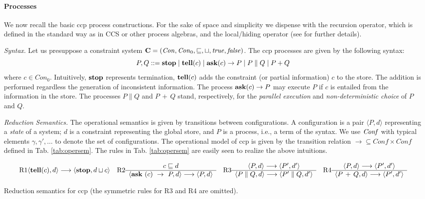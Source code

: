 \documentclass[copyright,creativecommons]{eptcs}
\newcommand{\tellp}[1]{\tell(#1)}
\newcommand{\askp}[2]{\ask \  #1 \  \rightarrow \ #2}
\newcommand{\true}{{\it true}}
\newcommand{\false}{{\it false}}
\newcommand{\ask}{{\bf ask}}
\newcommand{\tell}{{\bf tell}}
\newcommand{\Stop}{{\bf stop}}
\newcommand{\rrarrow}{\longrightarrow}
\newcommand{\Con}{\mathit{Con}}
\newcommand{\pairccp}[2]{\langle #1,#2 \rangle}
\newcommand{\trans}[1]{\stackrel{#1}{\rrarrow}}
\newcommand{\bigfrac}[2]{
\begin{array}{c}#1\\
\hline #2
\end{array}}
\newcommand{\Conf}{\mathit{Conf}}
\begin{document}
\paragraph{Processes}

We now recall the basic ccp process constructions. For the sake of space and simplicity we dispense with
the recursion operator, which is defined in the standard way as in CCS or other process algebras, and the local/hiding operator (see \cite{Aristizabal:11:FOSSACS} for further details).

\emph{Syntax.}\label{sec:syntax} Let us presuppose a constraint system ${\bf C}=
({\Con},{\Con}_0,\sqsubseteq,\sqcup,\true,\false)$. The ccp processes are given  by the following
syntax:
\[
P,Q::= \Stop \mid \tell(c) \mid \ask(c)\rightarrow P \mid P
\parallel Q  \mid P
 +   Q
\] where $c \in {\Con}_0$. Intuitively, $\Stop$ represents termination, $\tell(c)$ adds the constraint (or partial information) $c$ to the store.
The addition is performed regardless the generation of inconsistent information.
The process $\ask(c)\rightarrow P$ may execute $P$ if $c$ is entailed from the
information in the store. The processes $P \parallel Q$ and $P \, + \,  Q$ stand, respectively, for the
{\it parallel execution} and {\it non-deterministic choice} of $P$ and $Q$.



\emph{Reduction Semantics.}\label{sec:operationalmodel} The operational semantics is given by transitions
between configurations.
 A configuration is a pair $\pairccp{P}{d}$ representing a \emph{state} of
a system;  $d$ is a constraint representing the global store, and
$P$ is a process, i.e., a term of the syntax.  We use ${\it Conf}$ with
typical elements $\gamma,\gamma',\ldots$ to denote the set of
configurations.  The operational model of ccp is given by the transition
relation $\trans{} \subseteq \Conf  \times \Conf$ defined in Tab. \ref{tab:opersem}. The rules in Tab. \ref{tab:opersem} are
easily seen to realize the above intuitions.



\begin{table}
{\scriptsize
$$\makebox{R1} \pairccp{\tellp{c}}{d} \trans{}
\pairccp{\Stop}{d \sqcup c} \quad
\makebox{R2} \bigfrac{c \sqsubseteq d}{\pairccp{\askp{(c)}{P}}{d} \trans{} \pairccp{P}{d}}
\quad
\makebox{R3} \bigfrac{\pairccp{P}{d} \trans{}
\pairccp{P'}{d'}}{\pairccp{P \parallel Q}{d} \trans{}
\pairccp{P'\parallel Q}{d'}} \quad
\makebox{R4} \bigfrac{\pairccp{P}{d} \trans{}
\pairccp{P'}{d'}}{\pairccp{P \, + \, Q}{d} \trans{}
\pairccp{P'}{d'}}
$$

}
\caption{Reduction semantics for ccp (the symmetric rules for R3 and R4 are omitted).} \label{tab:opersem}
\end{table}
\end{document}
